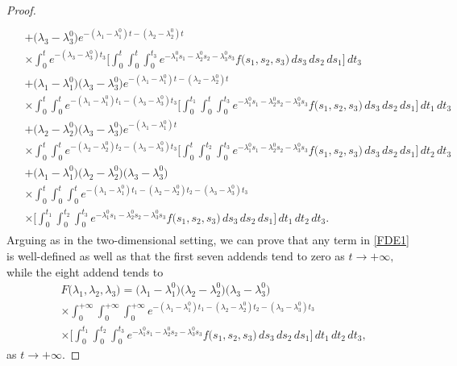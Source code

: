 \documentclass{amsart}
\theoremstyle{definition}
\theoremstyle{remark}
\numberwithin{equation}{section}
\begin{document}
\begin{proof}
{\begin{align}
\begin{split}
\\& +\bigl( \lambda_{3}-\lambda_{3}^{0}\bigr)e^{-(\lambda_{1}-\lambda_{1}^{0})t-(\lambda_{2}-\lambda_{2}^{0})t}
\\& \times \int^{t}_{0}e^{-(\lambda_{3}-\lambda_{3}^{0})t_{3}}\Biggl[ \int^{t}_{0}\int^{t}_{0}\int^{t_{3}}_{0}e^{-\lambda_{1}^{0}s_{1}-\lambda_{2}^{0}s_{2}-\lambda_{3}^{0}s_{3}}f\bigl( s_{1},s_{2},s_{3}\bigr)\, ds_{3} \, ds_{2}\, ds_{1} \Biggr]\, dt_{3}
\\& +\bigl( \lambda_{1}-\lambda_{1}^{0}\bigr)\bigl( \lambda_{3}-\lambda_{3}^{0}\bigr)e^{-(\lambda_{1}-\lambda_{1}^{0})t-(\lambda_{2}-\lambda_{2}^{0})t}
\\& \times \int^{t}_{0}\int^{t}_{0}e^{-(\lambda_{1}-\lambda_{1}^{0})t_{1}-(\lambda_{3}-\lambda_{3}^{0})t_{3}}\Biggl[ \int^{t_{1}}_{0}\int^{t}_{0}\int^{t_{3}}_{0}e^{-\lambda_{1}^{0}s_{1}-\lambda_{2}^{0}s_{2}-\lambda_{3}^{0}s_{3}}f\bigl( s_{1},s_{2},s_{3}\bigr)\, ds_{3} \, ds_{2}\, ds_{1} \Biggr]\, dt_{1}\, dt_{3}
\\& +\bigl( \lambda_{2}-\lambda_{2}^{0}\bigr)\bigl( \lambda_{3}-\lambda_{3}^{0}\bigr)e^{-(\lambda_{1}-\lambda_{1}^{0})t}
\\& \times \int^{t}_{0}\int^{t}_{0}e^{-(\lambda_{2}-\lambda_{2}^{0})t_{2}-(\lambda_{3}-\lambda_{3}^{0})t_{3}}\Biggl[ \int^{t}_{0}\int^{t_{2}}_{0}\int^{t_{3}}_{0}e^{-\lambda_{1}^{0}s_{1}-\lambda_{2}^{0}s_{2}-\lambda_{3}^{0}s_{3}}f\bigl( s_{1},s_{2},s_{3}\bigr)\, ds_{3} \, ds_{2}\, ds_{1} \Biggr]\, dt_{2}\, dt_{3}
\\& +\bigl( \lambda_{1}-\lambda_{1}^{0}\bigr)\bigl( \lambda_{2}-\lambda_{2}^{0}\bigr)\bigl( \lambda_{3}-\lambda_{3}^{0}\bigr)
\\& \times \int^{t}_{0}\int^{t}_{0}\int^{t}_{0}e^{-(\lambda_{1}-\lambda_{1}^{0})t_{1}-(\lambda_{2}-\lambda_{2}^{0})t_{2}-(\lambda_{3}-\lambda_{3}^{0})t_{3}}
\\& \times \Biggl[ \int^{t_{1}}_{0}\int^{t_{2}}_{0}\int^{t_{3}}_{0}e^{-\lambda_{1}^{0}s_{1}-\lambda_{2}^{0}s_{2}-\lambda_{3}^{0}s_{3}}f\bigl( s_{1},s_{2},s_{3}\bigr)\, ds_{3} \, ds_{2}\, ds_{1} \Biggr]\, dt_{1}\, dt_{2}\, dt_{3}.
\end{split}
\end{align}}
Arguing as in the two-dimensional setting, we can prove that any term in \eqref{FDE1} is well-defined as well as that the first seven addends tend to zero as $t\rightarrow +\infty,$ while the eight addend tends to
\begin{align*}
& F\bigl( \lambda_{1},\lambda_{2},\lambda_{3}\bigr)=\bigl( \lambda_{1}-\lambda_{1}^{0}\bigr)\bigl( \lambda_{2}-\lambda_{2}^{0}\bigr)\bigl( \lambda_{3}-\lambda_{3}^{0}\bigr)
\\& \times \int^{+\infty}_{0}\int^{+\infty}_{0}\int^{+\infty}_{0}e^{-(\lambda_{1}-\lambda_{1}^{0})t_{1}-(\lambda_{2}-\lambda_{2}^{0})t_{2}-(\lambda_{3}-\lambda_{3}^{0})t_{3}}
\\& \times \Biggl[ \int^{t_{1}}_{0}\int^{t_{2}}_{0}\int^{t_{3}}_{0}e^{-\lambda_{1}^{0}s_{1}-\lambda_{2}^{0}s_{2}-\lambda_{3}^{0}s_{3}}f\bigl( s_{1},s_{2},s_{3}\bigr)\, ds_{3} \, ds_{2}\, ds_{1} \Biggr]\, dt_{1}\, dt_{2}\, dt_{3},
\end{align*}
as $t\rightarrow +\infty .$
\end{proof}
\end{document}
